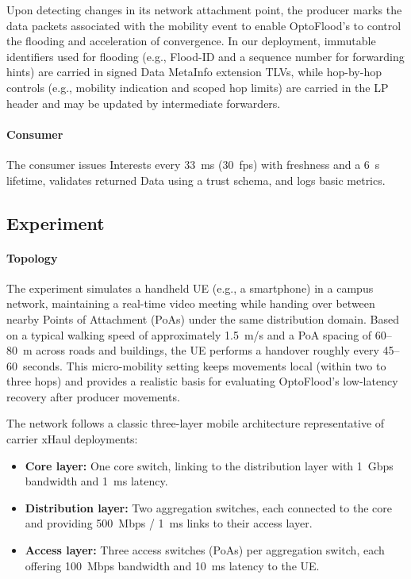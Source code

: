 Upon detecting changes in its network attachment point, the producer marks the data packets associated with the mobility event to enable OptoFlood’s to control the flooding and acceleration of convergence. In our deployment, immutable identifiers used for flooding (e.g., Flood-ID and a sequence number for forwarding hints) are carried in signed Data MetaInfo extension TLVs, while hop-by-hop controls (e.g., mobility indication and scoped hop limits) are carried in the LP header and may be updated by intermediate forwarders.

\paragraph{Consumer}
The consumer issues Interests every 33~ms (30~fps) with freshness and a 6~s lifetime, validates returned Data using a trust schema, and logs basic metrics.

\subsection{Experiment}
\paragraph{Topology}
The experiment simulates a handheld UE (e.g., a smartphone) in a campus network, maintaining a real-time video meeting while handing over between nearby Points of Attachment (PoAs) under the same distribution domain. Based on a typical walking speed of approximately 1.5~m/s and a PoA spacing of 60--80~m across roads and buildings, the UE performs a handover roughly every 45--60~seconds. This micro-mobility setting keeps movements local (within two to three hops) and provides a realistic basis for evaluating OptoFlood’s low-latency recovery after producer movements.

The network follows a classic three-layer mobile architecture representative of carrier xHaul deployments:
\begin{itemize}
    \item \textbf{Core layer:} One core switch, linking to the distribution layer with 1~Gbps bandwidth and 1~ms latency.
    \item \textbf{Distribution layer:} Two aggregation switches, each connected to the core and providing 500~Mbps / 1~ms links to their access layer.
    \item \textbf{Access layer:} Three access switches (PoAs) per aggregation switch, each offering 100~Mbps bandwidth and 10~ms latency to the UE.
\end{itemize}

